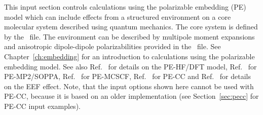 This input section controls calculations using the polarizable
embedding (PE) model\cite{pemodel1,pemodel2} which can include effects from a structured
environment on a core molecular system described using quantum mechanics.
The core system is defined by the \molinp\ file.
The environment can be described by multipole moment expansions
and anisotropic dipole-dipole polarizabilities provided in the \potinp\
file. See Chapter~\ref{ch:embedding} for an introduction to
calculations using the polarizable embedding model. See also Ref.~\cite{pescf} for
details on the PE-HF/DFT model, Ref.~\cite{pesoppa} for PE-MP2/SOPPA,
Ref.~\cite{pemcscf} for PE-MCSCF, Ref.~\cite{pecc} for PE-CC and Ref.~\cite{peeef,peeef2}
for details on the EEF effect. Note, that the input
options shown here cannot be used with PE-CC, because it is based on an older
implementation (see Section~\ref{sec:pecc} for PE-CC input examples).

